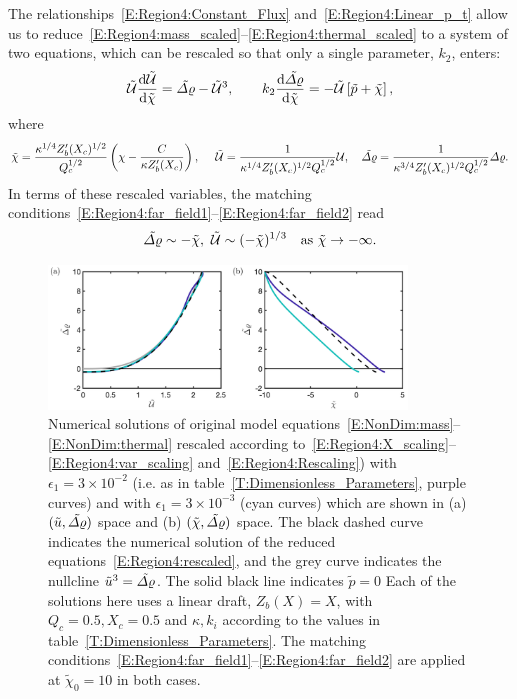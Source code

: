 \documentclass[openacc]{rsproca_new}%
\newcommand{\dd}[2]{\frac{\mathrm{d} #1}{\mathrm{d} #2}}
\newcommand{\epsone}{\epsilon_{1}} %
\begin{document}
The relationships~\eqref{E:Region4:Constant_Flux} and~\eqref{E:Region4:Linear_p_t} allow us to reduce~\eqref{E:Region4:mass_scaled}--\eqref{E:Region4:thermal_scaled} to a system of two equations, which can be rescaled so that only a single parameter, $k_2$, enters:
\begin{equation}\label{E:Region4:rescaled}
\tilde{\U} \dd{\tilde{\U}}{\tilde{\chi}} = \tilde{\p} - \tilde{\U}^3, \qquad 
k_2  \dd{\tilde{\p}}{\tilde{\chi}} = -\tilde{\U}\left[\tilde{p} + \tilde{\chi}\right],
\end{equation}
where
\begin{equation*}\label{E:Region4:Rescaling}
\tilde{\chi} = \frac{\kappa^{1/4}Z_b'(X_c)^{1/2}}{Q_c^{1/2}}\left(\chi - \frac{C}{\kappa Z_b'(X_c)}\right), ~\quad  \tilde{\mathcal{U}} = \frac{1}{\kappa^{1/4}Z_b'(X_c)^{1/2}Q_c^{1/2}}\mathcal{U},\quad \tilde{\varDelta \varrho}= \frac{1}{\kappa^{3/4}Z_b'(X_c)^{ 1/2}Q_c^{1/2}}\varDelta \varrho.
\end{equation*} 
In terms of these rescaled variables, the matching conditions~\eqref{E:Region4:far_field1}--\eqref{E:Region4:far_field2} read
\begin{equation}\label{E:Region4:Rescaled_farfield}
\tilde{\varDelta \varrho} \sim -\tilde{\chi},~ \tilde{\mathcal{U}}\sim (-\tilde{\chi})^{1/3}\quad \text{as}~\tilde{\chi}\to -\infty.
\end{equation}


\begin{figure}
\centering
\includegraphics[width = 0.85\textwidth]{Submitted_PRSA/make_plots/plots/figure5.png}
\caption{Numerical solutions of original model equations~\eqref{E:NonDim:mass}--\eqref{E:NonDim:thermal} rescaled according to~\eqref{E:Region4:X_scaling}--\eqref{E:Region4:var_scaling} and~\eqref{E:Region4:Rescaling}) with $\epsone = 3\times 10^{-2}$ (i.e. as in table~\ref{T:Dimensionless_Parameters}, purple curves) and with $\epsone = 3\times 10^{-3}$ (cyan curves) which are shown in (a) $(\tilde{u}, \tilde{\varDelta \varrho})$ space and (b) $(\tilde{\chi}, \tilde{\varDelta \varrho})$ space. The black dashed curve indicates the numerical solution of the reduced equations~\eqref{E:Region4:rescaled}, and the grey curve indicates the nullcline $\tilde{u}^3 = \tilde{\varDelta \varrho}$. The solid black line indicates $\tilde{p} = 0$ Each of the solutions here uses a linear draft, $Z_b(X) = X$, with $Q_c = 0.5, X_c = 0.5$ and $\kappa, k_i$ according to the values in table~\ref{T:Dimensionless_Parameters}. The matching conditions~\eqref{E:Region4:far_field1}--\eqref{E:Region4:far_field2} are applied at $\tilde{\chi}_0 = 10$ in both cases. }\label{fig:Region4}
\end{figure}
\end{document}
